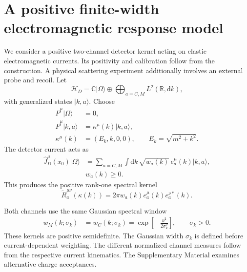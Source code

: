 \documentclass[12pt]{iopjournal}
\newcommand{\dd}{\mathrm d}
\theoremstyle{definition}
\theoremstyle{remark}
\begin{document}
\section{A positive finite-width electromagnetic response model}
\label{sec:positive-detector}

We consider a positive two-channel detector kernel acting on elastic electromagnetic currents. Its positivity and calibration follow from the construction. A physical scattering experiment additionally involves an external probe and recoil. Let
\begin{equation}
\mathcal H_D=\mathbb C|\Omega\rangle\oplus
\bigoplus_{a=C,M}L^2(\mathbb R,\dd k),
\end{equation}
with generalized states $|k,a\rangle$. Choose
\begin{align}
\hat P^\mu|\Omega\rangle&=0,\\
\hat P^\mu|k,a\rangle&=\kappa^\mu(k)|k,a\rangle,\\
\kappa^\mu(k)&=(E_k,k,0,0),\qquad E_k=\sqrt{m^2+k^2}.
\end{align}
The detector current acts as
\begin{align}
\hat J_D^\mu(x_0)|\Omega\rangle
&=\sum_{a=C,M}\int\dd k\,
\sqrt{w_a(k)}\,e_a^\mu(k)|k,a\rangle,
\nonumber\\
&w_a(k)\ge0.
\label{eq:detector-realization}
\end{align}
This produces the positive rank-one spectral kernel
\begin{equation}
\widetilde R_a^{\mu\nu}(\kappa(k))
=2\pi w_a(k)e_a^\mu(k)e_a^{\nu *}(k).
\end{equation}

Both channels use the same Gaussian spectral window
\begin{align}
w_M(k;\sigma_k)&=w_C(k;\sigma_k)
=\exp\!\left[-\frac{k^2}{2\sigma_k^2}\right],
\qquad \sigma_k>0.
\label{eq:explicit-detector-weight}
\end{align}
These kernels are positive semidefinite. The Gaussian width $\sigma_k$ is defined before current-dependent weighting. The different normalized channel measures follow from the respective current kinematics. The Supplementary Material examines alternative charge acceptances.
\end{document}
